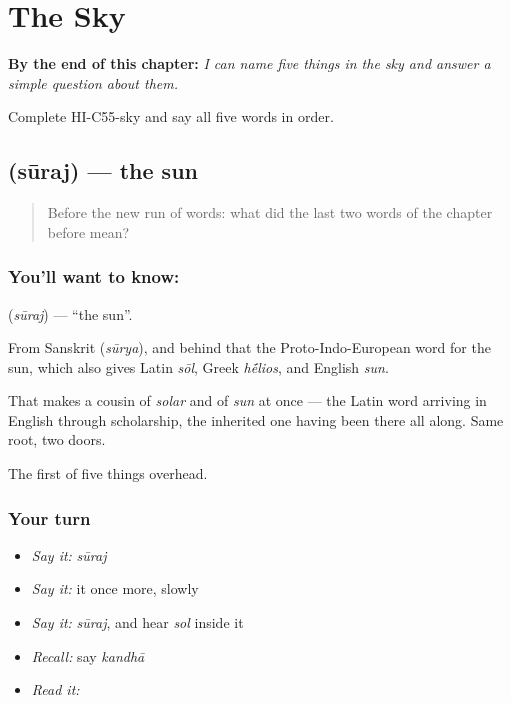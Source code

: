 
\chapter{The Sky}
\label{ch:hi-the-sky}

\begin{chapteropening}
\textbf{By the end of this chapter:} \emph{I can name five things in the sky and answer a simple question about them.}

Complete HI-C55-sky and say all five words in order.
\end{chapteropening}

\section[\texorpdfstring{\hi{सूरज} (sūraj)}{सूरज (sūraj)}]{ (sūraj) — the sun}

\label{lesson:HI-C55-sun}



\begin{quote}
Before the new run of words: what did the last two words of the chapter before mean?
\end{quote}

\subsection*{You'll want to know: }
\textbf{} (\emph{sūraj}) — \textquotedblleft{}the sun\textquotedblright{}.

From Sanskrit  (\emph{sūrya}), and behind that the Proto-Indo-European word for the sun, which also gives Latin \emph{sōl}, Greek \emph{h\'{\={e}}lios}, and English \emph{sun}.

That makes  a cousin of \emph{solar} and of \emph{sun} at once — the Latin word arriving in English through scholarship, the inherited one having been there all along. Same root, two doors.

\begin{grammarlens}[title={What you've built}]
The first of five things overhead.
\end{grammarlens}

\subsection*{Your turn}
\begin{itemize}
\raggedright
  \item \emph{Say it:} \emph{sūraj}
  \item \emph{Say it:} it once more, slowly
  \item \emph{Say it:} \emph{sūraj}, and hear \emph{sol} inside it
  \item \emph{Recall:} say \emph{kandhā}
  \item \emph{Read it:} \textbf{}
\end{itemize}

